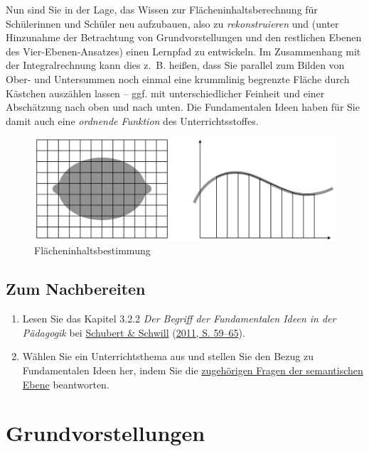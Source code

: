 \documentclass[
  ngerman,
]{scrbook}
\providecommand{\tightlist}{%
  \setlength{\itemsep}{0pt}\setlength{\parskip}{0pt}}
\theoremstyle{definition}
\theoremstyle{definition}
\theoremstyle{definition}
\theoremstyle{definition}
\theoremstyle{remark}
\begin{document}
Nun sind Sie in der Lage, das Wissen zur Flächeninhaltsberechnung für Schülerinnen und Schüler neu aufzubauen, also zu \emph{rekonstruieren} und (unter Hinzunahme der Betrachtung von Grundvorstellungen und den restlichen Ebenen des Vier-Ebenen-Ansatzes) einen Lernpfad zu entwickeln. Im Zusammenhang mit der Integralrechnung kann dies z.~B. heißen, dass Sie parallel zum Bilden von Ober- und Untersummen noch einmal eine krummlinig begrenzte Fläche durch Kästchen auszählen lassen -- ggf. mit unterschiedlicher Feinheit und einer Abschätzung nach oben und nach unten. Die Fundamentalen Ideen haben für Sie damit auch eine \emph{ordnende Funktion} des Unterrichtsstoffes.

\begin{figure}

{\centering \includegraphics[width=0.75\linewidth]{pictures/3-Flaeche} 

}

\caption{Flächeninhaltsbestimmung}\label{fig:Flaeche}
\end{figure}

\hypertarget{fundamentale-ideen-nachbereitung}{%
\section{Zum Nachbereiten}\label{fundamentale-ideen-nachbereitung}}

\begin{enumerate}
\def\labelenumi{\arabic{enumi}.}
\tightlist
\item
  Lesen Sie das Kapitel 3.2.2 \emph{Der Begriff der Fundamentalen Ideen in der Pädagogik} bei \protect\hyperlink{ref-Schubert:2011}{Schubert \& Schwill} (\protect\hyperlink{ref-Schubert:2011}{2011, S. 59--65}).
\item
  Wählen Sie ein Unterrichtsthema aus und stellen Sie den Bezug zu Fundamentalen Ideen her, indem Sie die \protect\hyperlink{tab:fragen-ebenen}{zugehörigen Fragen der semantischen Ebene} beantworten.
\end{enumerate}

\hypertarget{grundvorstellungen}{%
\chapter{Grundvorstellungen}\label{grundvorstellungen}}
\end{document}
